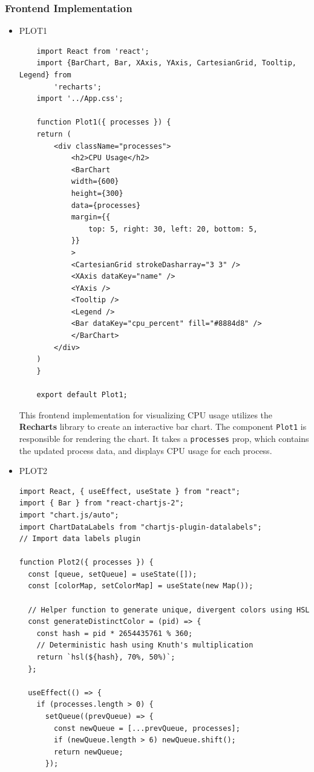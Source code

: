 \documentclass[12pt]{article}
\begin{document}
\subsubsection{Frontend Implementation}
\begin{itemize}
    \item PLOT1
    \begin{verbatim}
    import React from 'react';
    import {BarChart, Bar, XAxis, YAxis, CartesianGrid, Tooltip, Legend} from 
        'recharts';
    import '../App.css';

    function Plot1({ processes }) {
    return (
        <div className="processes">
            <h2>CPU Usage</h2>
            <BarChart
            width={600}
            height={300}
            data={processes}
            margin={{
                top: 5, right: 30, left: 20, bottom: 5,
            }}
            >
            <CartesianGrid strokeDasharray="3 3" />
            <XAxis dataKey="name" />
            <YAxis />
            <Tooltip />
            <Legend />
            <Bar dataKey="cpu_percent" fill="#8884d8" />
            </BarChart>
        </div>
    )
    }

    export default Plot1;
\end{verbatim}

This frontend implementation for visualizing CPU usage utilizes the \textbf{Recharts} library to create an interactive bar chart. The component \texttt{Plot1} is responsible for rendering the chart. It takes a \texttt{processes} prop, which contains the updated process data, and displays CPU usage for each process.



\item PLOT2
\begin{verbatim}
import React, { useEffect, useState } from "react";
import { Bar } from "react-chartjs-2";
import "chart.js/auto";
import ChartDataLabels from "chartjs-plugin-datalabels"; 
// Import data labels plugin

function Plot2({ processes }) {
  const [queue, setQueue] = useState([]);
  const [colorMap, setColorMap] = useState(new Map());

  // Helper function to generate unique, divergent colors using HSL
  const generateDistinctColor = (pid) => {
    const hash = pid * 2654435761 % 360; 
    // Deterministic hash using Knuth's multiplication
    return `hsl(${hash}, 70%, 50%)`;
  };

  useEffect(() => {
    if (processes.length > 0) {
      setQueue((prevQueue) => {
        const newQueue = [...prevQueue, processes];
        if (newQueue.length > 6) newQueue.shift();
        return newQueue;
      });


\end{verbatim}
\end{itemize}
\end{document}
